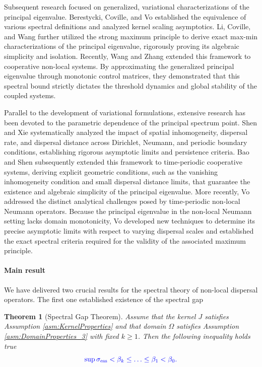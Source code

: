 \documentclass[12pt, a4paper]{article}
\newcommand{\revision}[1]{\textcolor{blue}{#1}}
\theoremstyle{break}
\newtheorem{thm}{Theorem}[section]
\theoremstyle{break}
\theoremstyle{break}
\theoremstyle{break}
\theoremstyle{break}
\theoremstyle{break}
\theoremstyle{break}
\theoremstyle{break}
\theoremstyle{break}
\begin{document}
Subsequent research focused on generalized, variational characterizations of the principal eigenvalue. Berestycki, Coville, and Vo \cite{BerestyckiCovilleVo2016} established the equivalence of various spectral definitions and analyzed kernel scaling asymptotics. Li, Coville, and Wang \cite{LiCovilleWang2017} further utilized the strong maximum principle to derive exact max-min characterizations of the principal eigenvalue, rigorously proving its algebraic simplicity and isolation. Recently, Wang and Zhang \cite{WangZhang2026} extended this framework to cooperative non-local systems. By approximating the generalized principal eigenvalue through monotonic control matrices, they demonstrated that this spectral bound strictly dictates the threshold dynamics and global stability of the coupled systems.

Parallel to the development of variational formulations, extensive research has been devoted to the parametric dependence of the principal spectrum point. Shen and Xie \cite{ShenXie2015} systematically analyzed the impact of spatial inhomogeneity, dispersal rate, and dispersal distance across Dirichlet, Neumann, and periodic boundary conditions, establishing rigorous asymptotic limits and persistence criteria. Bao and Shen \cite{BaoShen2016} subsequently extended this framework to time-periodic cooperative systems, deriving explicit geometric conditions, such as the vanishing inhomogeneity condition and small dispersal distance limits, that guarantee the existence and algebraic simplicity of the principal eigenvalue. More recently, Vo \cite{Vo2022} addressed the distinct analytical challenges posed by time-periodic non-local Neumann operators. Because the principal eigenvalue in the non-local Neumann setting lacks domain monotonicity, Vo developed new techniques to determine its precise asymptotic limits with respect to varying dispersal scales and established the exact spectral criteria required for the validity of the associated maximum principle.

\paragraph{Main result}

We have delivered two crucial results for the spectral theory of non-local dispersal operators. The first one established existence of the spectral gap

\begin{thm}[Spectral Gap Theorem]
    \label{thm:spectral_gap_theorem}
    Assume that the kernel $J$ satisfies Assumption \ref{asm:KernelProperties} and that domain $\Omega$ satisfies Assumption \ref{asm:DomainProperties_3} with fixed $k \geq 1$. Then the following inequality holds true
    \begin{equation}
        \revision{\sup \sigma_{\mathrm{ess}} < \beta_k \leq \ldots \leq \beta_1 < \beta_0.}
    \end{equation}
\end{thm}
\end{document}
